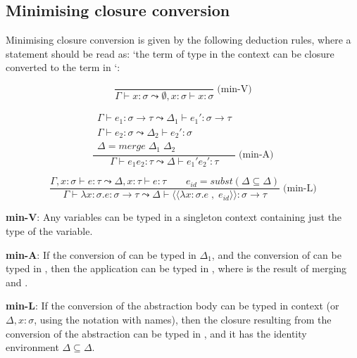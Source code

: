 \documentclass[bsc,frontabs,oneside,singlespacing,parskip,deptreport]{infthesis}
\theoremstyle{definition}
\theoremstyle{lemma}
\begin{document}
\subsection{Minimising closure conversion}
\label{sec:minim-clos-conv}

Minimising closure conversion is given by the following deduction
rules, where a statement  should be read as:
`the term  of type  in the context  can be closure
converted to the term  in `:

\begin{minipage}{.5\textwidth}
  \[
    \frac
    {}
    {\Gamma \vdash x : \sigma \leadsto \emptyset , x : \sigma \vdash x : \sigma}
    \;\text{(min-V)}
  \]
\end{minipage}%
\begin{minipage}{.5\textwidth}
  \[
    \frac
    {
      \begin{matrix}
        \Gamma \vdash e_1 : \sigma \to \tau \leadsto \Delta_1 \vdash
        e_1' : \sigma \to \tau \\
        \Gamma \vdash e_2 : \sigma \leadsto \Delta_2 \vdash e_2' :
        \sigma \\
        \Delta = merge \; \Delta_1 \; \Delta_2
      \end{matrix}
      }
    {\Gamma ⊢ e_1 e_2 : \tau  \leadsto \Delta  \vdash e_1' e_2' : \tau}
     \;\text{(min-A)}
  \]
\end{minipage}

\[
  \frac {\Gamma , x : \sigma ⊢ e : \tau \leadsto \Delta , x : \tau
    \vdash e : \tau \quad \quad e_{id} = subst ( \Delta \subseteq
    \Delta )}
  {\Gamma \vdash \lambda x : \sigma . e : \sigma \to \tau \leadsto
    \Delta \vdash \langle\langle \lambda x : \sigma . e \; , \; e_{id}
    \rangle\rangle : \sigma \to \tau} \; \text{(min-L)}
\]

\textbf{min-V}: Any variables can be typed in a singleton context
containing just the type of the variable.

\textbf{min-A}: If the conversion  of  can be typed in
$\Delta_1$, and the conversion  of  can be typed in ,
then the application  can be typed in , where 
is the result of merging  and .

\textbf{min-L}: If the conversion  of the abstraction body
 can be typed in context  (or $\Delta, x : \sigma$,
using the notation with names), then the closure resulting from the
conversion of the abstraction can be typed in , and it has the
identity environment $\Delta \subseteq \Delta$.
\end{document}
